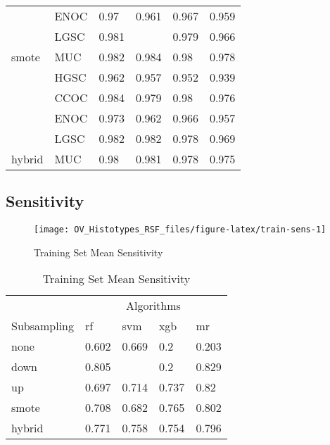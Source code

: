\documentclass[
]{report}
\begin{document}
\begin{table}
\begin{tabular}[t]{l|l|l|l|l|l}
\cline{2-6}
 & ENOC & 0.97 & 0.961 & 0.967 & 0.959\\
\cline{2-6}
 & LGSC & 0.981 & \cellcolor[HTML]{90ee90}{0.985} & 0.979 & 0.966\\
\cline{2-6}
\multirow{-5}{*}{\raggedright\arraybackslash smote} & MUC & 0.982 & 0.984 & 0.98 & 0.978\\
\cline{1-6}
 & HGSC & 0.962 & 0.957 & 0.952 & 0.939\\
\cline{2-6}
 & CCOC & 0.984 & 0.979 & 0.98 & 0.976\\
\cline{2-6}
 & ENOC & 0.973 & 0.962 & 0.966 & 0.957\\
\cline{2-6}
 & LGSC & 0.982 & 0.982 & 0.978 & 0.969\\
\cline{2-6}
\multirow{-5}{*}{\raggedright\arraybackslash hybrid} & MUC & 0.98 & 0.981 & 0.978 & 0.975\\
\hline
\end{tabular}
\end{table}

\hypertarget{sensitivity}{%
\subsection{Sensitivity}\label{sensitivity}}

\begin{figure}[H]

{\centering \texttt{[image: OV\_Histotypes\_RSF\_files/figure-latex/train-sens-1]} 

}

\caption{Training Set Mean Sensitivity}\label{fig:train-sens}
\end{figure}

\begin{table}

\caption{\label{tab:train-sens-table}Training Set Mean Sensitivity}
\centering
\begin{tabular}[t]{l|l|l|l|l}
\hline
\multicolumn{1}{c|}{ } & \multicolumn{4}{c}{Algorithms} \\
\cline{2-5}
Subsampling & rf & svm & xgb & mr\\
\hline
none & 0.602 & 0.669 & 0.2 & 0.203\\
\hline
down & 0.805 & \cellcolor[HTML]{90ee90}{0.838} & 0.2 & 0.829\\
\hline
up & 0.697 & 0.714 & 0.737 & 0.82\\
\hline
smote & 0.708 & 0.682 & 0.765 & 0.802\\
\hline
hybrid & 0.771 & 0.758 & 0.754 & 0.796\\
\hline
\end{tabular}
\end{table}
\end{document}
